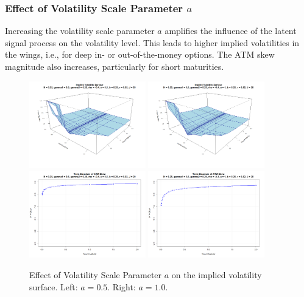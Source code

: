 \subsubsection*{Effect of Volatility Scale Parameter $a$}
Increasing the volatility scale parameter $a$ amplifies the influence of the latent signal process on the volatility level. This leads to higher implied volatilities in the wings, i.e., for deep in- or out-of-the-money options. The ATM skew magnitude also increases, particularly for short maturities.
\begin{figure}[H]
    \centering
    \includegraphics[width=0.45\textwidth]{figures/5.2 Individual Parameter Effects/a=0.5_iv_surface.png}
	\includegraphics[width=0.45\textwidth]{figures/5.2 Individual Parameter Effects/a=1.0_iv_surface.png}
	\includegraphics[width=0.45\textwidth]{figures/5.2 Individual Parameter Effects/a=0.5_atm_skew.png}
	\includegraphics[width=0.45\textwidth]{figures/5.2 Individual Parameter Effects/a=1.0_atm_skew.png}
    \caption{Effect of Volatility Scale Parameter $a$ on the implied volatility surface. Left: $a=0.5$. Right: $a=1.0$.}
    \label{fig:a_effect}
\end{figure}

